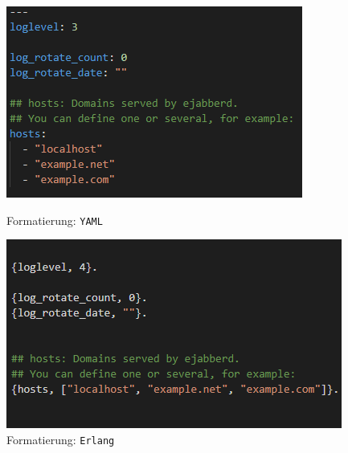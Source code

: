 \documentclass[a4paper,titlepage,halfparskip,12pt]{scrreprt}
\begin{document}
\begin{onehalfspacing}
\begin{figure}
\centering
\begin{minipage}{.5\textwidth}
  \centering
  \includegraphics[width=.8\linewidth]{images/exampleYAMLConfig}
  \caption{Formatierung: \texttt{YAML}}
  \label{img:YAMLconfig}
\end{minipage}%
\begin{minipage}{.5\textwidth}
  \centering
  \includegraphics[width=.9\linewidth]{images/ejabberdErlangConfig}
  \caption{Formatierung: \texttt{Erlang}}
  \label{img:ErlangConfig}
\end{minipage}
\end{figure}


\end{onehalfspacing}
\end{document}
